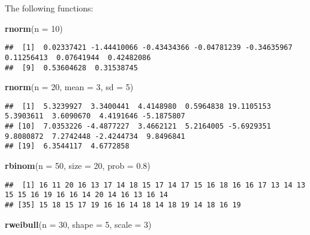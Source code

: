 \documentclass[]{book}
\newenvironment{Shaded}{\begin{snugshade}}{\end{snugshade}}
\newcommand{\KeywordTok}[1]{\textcolor[rgb]{0.13,0.29,0.53}{\textbf{{#1}}}}
\newcommand{\DataTypeTok}[1]{\textcolor[rgb]{0.13,0.29,0.53}{{#1}}}
\newcommand{\DecValTok}[1]{\textcolor[rgb]{0.00,0.00,0.81}{{#1}}}
\newcommand{\FloatTok}[1]{\textcolor[rgb]{0.00,0.00,0.81}{{#1}}}
\newcommand{\NormalTok}[1]{{#1}}
\begin{document}
The following functions:

\begin{Shaded}
\begin{Highlighting}[]
\KeywordTok{rnorm}\NormalTok{(}\DataTypeTok{n =} \DecValTok{10}\NormalTok{)}
\end{Highlighting}
\end{Shaded}

\begin{verbatim}
##  [1]  0.02337421 -1.44410066 -0.43434366 -0.04781239 -0.34635967  0.11256413  0.07641944  0.42482086
##  [9]  0.53604628  0.31538745
\end{verbatim}

\begin{Shaded}
\begin{Highlighting}[]
\KeywordTok{rnorm}\NormalTok{(}\DataTypeTok{n =} \DecValTok{20}\NormalTok{, }\DataTypeTok{mean =} \DecValTok{3}\NormalTok{, }\DataTypeTok{sd =} \DecValTok{5}\NormalTok{)}
\end{Highlighting}
\end{Shaded}

\begin{verbatim}
##  [1]  5.3239927  3.3400441  4.4148980  0.5964838 19.1105153  5.3903611  3.6090670  4.4191646 -5.1875807
## [10]  7.0353226 -4.4877227  3.4662121  5.2164005 -5.6929351  9.8080872  7.2742448 -2.4244734  9.8496841
## [19]  6.3544117  4.6772858
\end{verbatim}

\begin{Shaded}
\begin{Highlighting}[]
\KeywordTok{rbinom}\NormalTok{(}\DataTypeTok{n =} \DecValTok{50}\NormalTok{, }\DataTypeTok{size =} \DecValTok{20}\NormalTok{, }\DataTypeTok{prob =} \FloatTok{0.8}\NormalTok{)}
\end{Highlighting}
\end{Shaded}

\begin{verbatim}
##  [1] 16 11 20 16 13 17 14 18 15 17 14 17 15 16 18 16 16 17 13 14 13 15 15 16 19 16 16 14 20 14 16 13 16 14
## [35] 15 18 15 17 19 16 16 14 18 14 18 19 14 18 16 19
\end{verbatim}

\begin{Shaded}
\begin{Highlighting}[]
\KeywordTok{rweibull}\NormalTok{(}\DataTypeTok{n =} \DecValTok{30}\NormalTok{, }\DataTypeTok{shape =} \DecValTok{5}\NormalTok{, }\DataTypeTok{scale =} \DecValTok{3}\NormalTok{)}
\end{Highlighting}
\end{Shaded}
\end{document}
